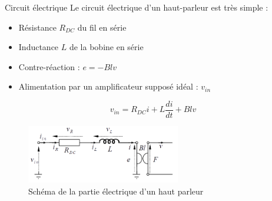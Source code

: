 \documentclass[aspectratio=169]{beamer}
\begin{document}
\begin{frame}{Circuit électrique}
Le circuit électrique d'un haut-parleur est très simple :
\begin{itemize}
	\item Résistance $R_{DC}$ du fil en série
	\item Inductance $L$ de la bobine en série
	\item Contre-réaction : $e=-Blv$
	\item Alimentation par un amplificateur supposé idéal : $v_{in}$
\end{itemize}
\begin{equation*}
	v_{in} = R_{DC}i + L \frac{di}{dt} + Blv
\end{equation*}
\begin{figure}[!h]
	\begin{center}
	\includegraphics[width=0.6\textwidth]{figure/schema_elec.png}
	\end{center}
	\caption{Schéma de la partie électrique d'un haut parleur}
	\label{schema_elec}
\end{figure}
\end{frame}
\end{document}
